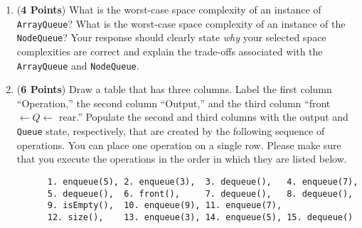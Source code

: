 \documentclass[12pt]{article}
\begin{document}
\begin{enumerate}
  \begin{enumerate}
    
  \item ({\bf 4 Points}) What is the worst-case space complexity of an
    instance of {\tt ArrayQueue}?  What is the worst-case space
    complexity of an instance of the {\tt NodeQueue}?  Your response
    should clearly state {\em why} your selected space complexities
    are correct and explain the trade-offs associated with the {\tt
      ArrayQueue} and {\tt NodeQueue}.
    

  \item ({\bf 6 Points}) Draw a table that has three columns.  Label
    the first column ``Operation,'' the second column ``Output,'' and
    the third column ``front $\leftarrow Q \leftarrow$ rear.''
    Populate the second and third columns with the output and {\tt
    Queue} state, respectively, that are created by the following
    sequence of operations.  You can place one operation on a single
    row. Please make sure that you execute the operations in the order
    in which they are listed below.  \\

    \begin{verbatim}
      1. enqueue(5), 2. enqueue(3),  3. dequeue(),   4. enqueue(7), 
      5. dequeue(),  6. front(),     7. dequeue(),   8. dequeue(), 
      9. isEmpty(),  10. enqueue(9), 11. enqueue(7), 
      12. size(),    13. enqueue(3), 14. enqueue(5), 15. dequeue()
    \end{verbatim}



\end{enumerate}
\end{enumerate}
\end{document}
